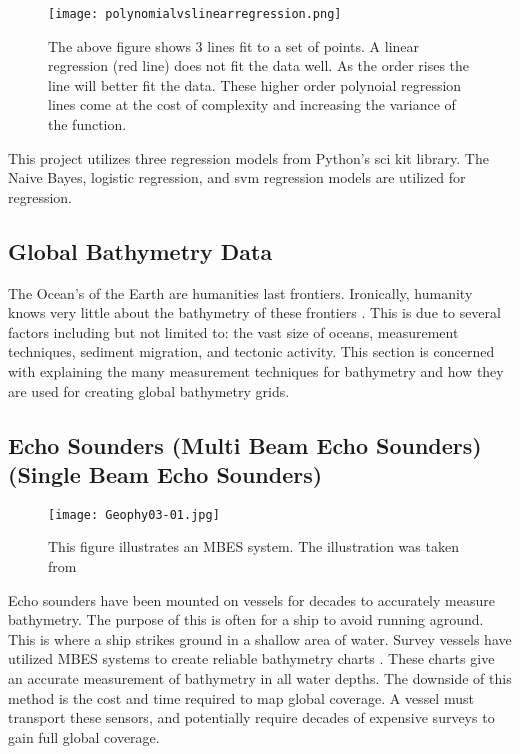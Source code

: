 \begin{figure}[htp]
    \centering
    \texttt{[image: polynomialvslinearregression.png]}
    \caption{The above figure shows 3 lines fit to a set of points. A linear regression (red line) does not fit the data well.
    As the order rises the line will better fit the data.
    These higher order polynoial regression lines come at the cost of complexity and increasing the variance of the function.}
    \label{fig:repressionexample}
\end{figure}


This project utilizes three regression models from Python's sci kit library.
The Naive Bayes\cite{sklearn_api}, logistic regression\cite{sklearn_api}, and svm regression\cite{sklearn_api} models are utilized for regression.

\subsection{Global Bathymetry Data}
The Ocean's of the Earth are humanities last frontiers.
Ironically, humanity knows very little about the bathymetry of these frontiers \cite{becker2009global}.
This is due to several factors including but not limited to: the vast size of oceans, measurement techniques, sediment migration, and tectonic activity.
This section is concerned with explaining the many measurement techniques for bathymetry and how they are used for creating global bathymetry grids.

\subsection{Echo Sounders (Multi Beam Echo Sounders)(Single Beam Echo Sounders) }

\begin{figure}[htp]
    \centering
    \texttt{[image: Geophy03-01.jpg]}
    \caption{This figure illustrates an \ac{MBES} system. The illustration was taken from \cite{monacoWeb}}
    \label{fig:MBES}
\end{figure}

Echo sounders have been mounted on vessels for decades to accurately measure bathymetry.
The purpose of this is often for a ship to avoid running aground.
This is where a ship strikes ground in a shallow area of water.
Survey vessels have utilized \ac{MBES} systems to create reliable bathymetry charts \cite{farr1980multibeam}.
These charts give an accurate measurement of bathymetry in all water depths.
The downside of this method is the cost and time required to map global coverage.
A vessel must transport these sensors, and potentially require decades of expensive surveys to gain full global coverage.

